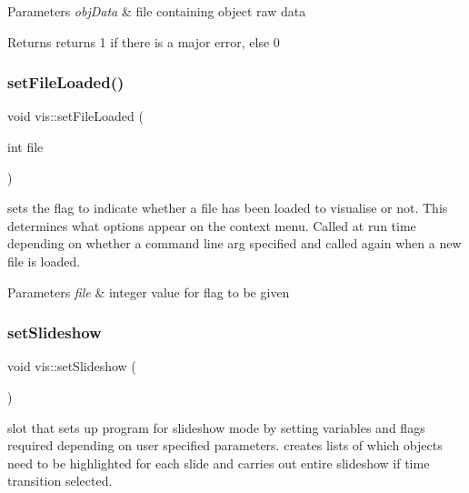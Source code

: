\begin{DoxyParams}{Parameters}
{\em obj\+Data} & file containing object raw data \\
\hline
\end{DoxyParams}
\begin{DoxyReturn}{Returns}
returns 1 if there is a major error, else 0 
\end{DoxyReturn}
\mbox{\label{classvis_a49b2f075d0ee40e1baced4f1d7bf9cb7}} 
\subsubsection{\texorpdfstring{set\+File\+Loaded()}{setFileLoaded()}}
{\footnotesize\ttfamily void vis\+::set\+File\+Loaded (\begin{DoxyParamCaption}\item[{int}]{file }\end{DoxyParamCaption})}

sets the flag to indicate whether a file has been loaded to visualise or not. This determines what options appear on the context menu. Called at run time depending on whether a command line arg specified and called again when a new file is loaded.


\begin{DoxyParams}{Parameters}
{\em file} & integer value for flag to be given \\
\hline
\end{DoxyParams}
\mbox{\label{classvis_ae8441d597e876882029ee13b16aa4cc2}} 
\subsubsection{\texorpdfstring{set\+Slideshow}{setSlideshow}}
{\footnotesize\ttfamily void vis\+::set\+Slideshow (\begin{DoxyParamCaption}{ }\end{DoxyParamCaption})\hspace{0.3cm}{\ttfamily [slot]}}

slot that sets up program for slideshow mode by setting variables and flags required depending on user specified parameters. creates lists of which objects need to be highlighted for each slide and carries out entire slideshow if time transition selected.

